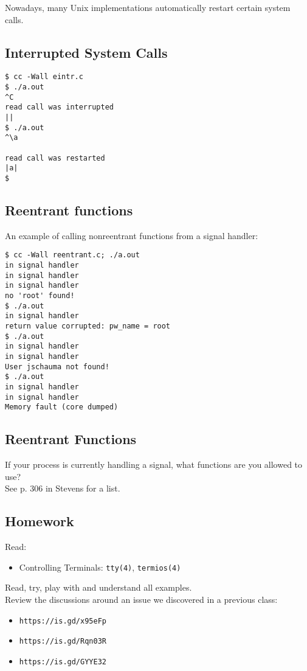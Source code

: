 \documentclass[xga]{xdvislides}
\begin{document}
Nowadays, many Unix implementations automatically restart certain system
calls.

\subsection{Interrupted System Calls}
\begin{verbatim}
$ cc -Wall eintr.c
$ ./a.out
^C
read call was interrupted
||
$ ./a.out
^\a

read call was restarted
|a|
$
\end{verbatim}

\subsection{Reentrant functions}
An example of calling nonreentrant functions from a signal handler:
\begin{verbatim}
$ cc -Wall reentrant.c; ./a.out
in signal handler
in signal handler
in signal handler
no 'root' found!
$ ./a.out
in signal handler
return value corrupted: pw_name = root
$ ./a.out
in signal handler
in signal handler
User jschauma not found!
$ ./a.out
in signal handler
in signal handler
Memory fault (core dumped)
\end{verbatim}

\subsection{Reentrant Functions}

If your process is currently handling a signal, what functions are you allowed
to use? \\

See p. 306 in Stevens for a list.


\subsection{Homework}

Read:
\begin{itemize}
	\item Controlling Terminals: {\tt tty(4)}, {\tt termios(4)}
\end{itemize}
\vspace{.5in}
Read, try, play with and understand all examples. \\

Review the discussions around an issue we discovered
in a previous class:
\begin{itemize}
	\item {\tt https://is.gd/x95eFp}
	\item {\tt https://is.gd/Rqn03R}
	\item {\tt https://is.gd/GYYE32}
\end{itemize}
\end{document}
